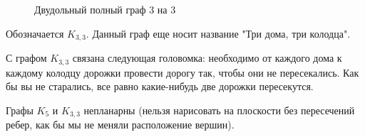 \documentclass[russian]{lecture-notes}
\begin{document}
\begin{figure}[H]
    \centering
    \caption{Двудольный полный граф 3 на 3}
    \label{fig:4}
\end{figure}
\begin{note}
    Обозначается $K_{3,3}$. Данный граф еще носит название "Три дома, три колодца".
\end{note}

С графом $K_{3,3}$ связана следующая головомка: необходимо от каждого дома   к каждому колодцу дорожки провести дорогу так, чтобы они не пересекались. Как бы вы не старались, все равно какие-нибудь две дорожки пересекутся.

\begin{theorem}
    Графы $K_5$ и $K_{3,3}$ непланарны (нельзя нарисовать на плоскости без пересечений ребер, как бы мы не меняли расположение вершин).
\end{theorem}
\end{document}
